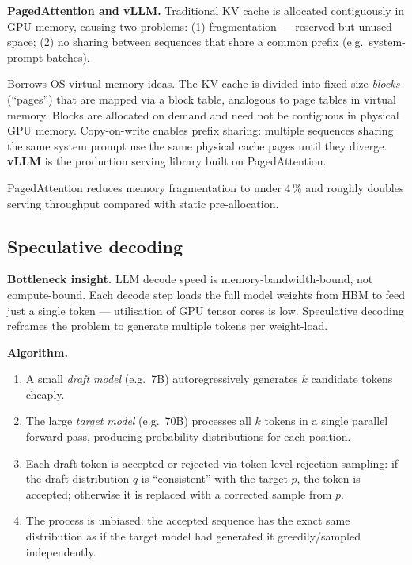 \textbf{PagedAttention and vLLM.} Traditional KV cache is allocated contiguously in GPU
memory, causing two problems: (1) fragmentation --- reserved but unused space; (2) no
sharing between sequences that share a common prefix (e.g.\ system-prompt batches).

\begin{paperbox}[title={PagedAttention (Kwon et al.\ 2023)}]
  Borrows OS virtual memory ideas. The KV cache is divided into fixed-size
  \emph{blocks} (``pages'') that are mapped via a block table, analogous to page
  tables in virtual memory. Blocks are allocated on demand and need not be contiguous
  in physical GPU memory. Copy-on-write enables prefix sharing: multiple sequences
  sharing the same system prompt use the same physical cache pages until they diverge.
  \textbf{vLLM} is the production serving library built on PagedAttention.
\end{paperbox}

PagedAttention reduces memory fragmentation to under 4\,\% and roughly doubles serving
throughput compared with static pre-allocation.

\subsection{Speculative decoding}

\textbf{Bottleneck insight.} LLM decode speed is memory-bandwidth-bound, not
compute-bound. Each decode step loads the full model weights from HBM to feed just a
single token --- utilisation of GPU tensor cores is low. Speculative decoding reframes
the problem to generate multiple tokens per weight-load.

\textbf{Algorithm.}
\begin{enumerate}
  \item A small \emph{draft model} (e.g.\ 7B) autoregressively generates $k$ candidate
    tokens cheaply.
  \item The large \emph{target model} (e.g.\ 70B) processes all $k$ tokens in a single
    parallel forward pass, producing probability distributions for each position.
  \item Each draft token is accepted or rejected via token-level rejection sampling: if
    the draft distribution $q$ is ``consistent'' with the target $p$, the token is
    accepted; otherwise it is replaced with a corrected sample from $p$.
  \item The process is unbiased: the accepted sequence has the exact same distribution
    as if the target model had generated it greedily/sampled independently.
\end{enumerate}

